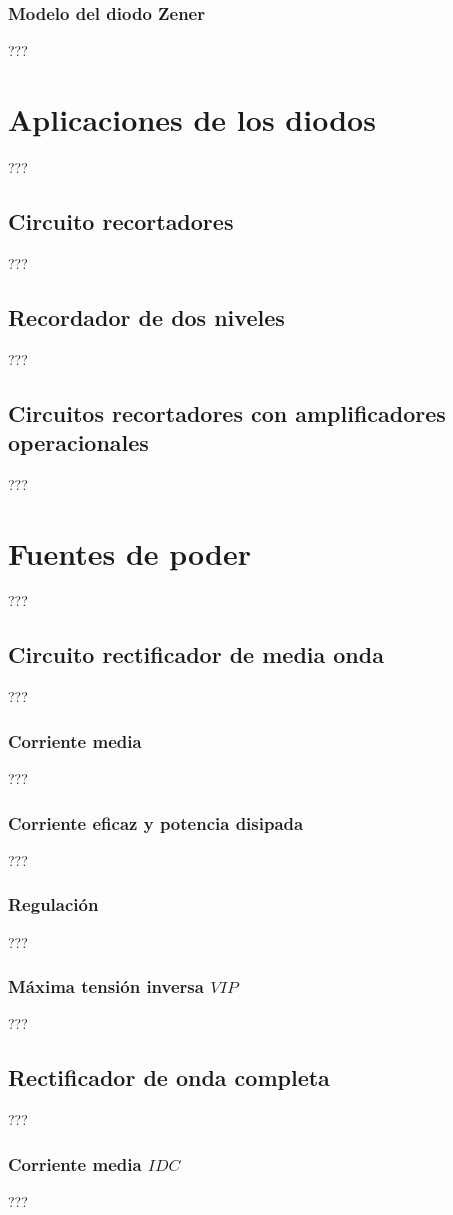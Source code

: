 \subsubsection{Modelo del diodo Zener}
???
\section{Aplicaciones de los diodos}
???
\subsection{Circuito recortadores}
???
\subsection{Recordador de dos niveles}
???
\subsection{Circuitos recortadores con amplificadores operacionales}
???
\section{Fuentes de poder}
???
\subsection{Circuito rectificador de media onda}
???
\subsubsection{Corriente media}
???
\subsubsection{Corriente eficaz y potencia disipada}
???
\subsubsection{Regulación}
???
\subsubsection{Máxima tensión inversa $VIP$}
???
\subsection{Rectificador de onda completa}
???
\subsubsection{Corriente media $IDC$}
???
